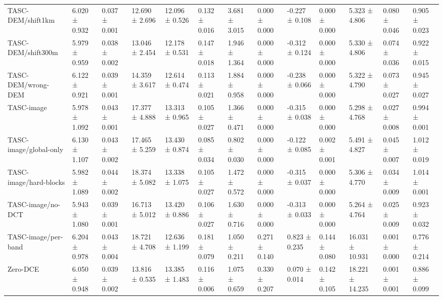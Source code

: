\begin{table}[t]
\begin{tabular}{lllllllllllll}
TASC-DEM/shift1km & 6.020 ± 0.932 & 0.037 ± 0.001 & 12.690 ± 2.696 & 12.096 ± 0.526 & 0.132 ± 0.016 & 3.681 ± 3.015 & 0.000 ± 0.000 & -0.227 ± 0.108 & 0.000 ± 0.000 & 5.323 ± 4.806 & 0.080 ± 0.046 & 0.905 ± 0.023 \\
TASC-DEM/shift300m & 5.979 ± 0.959 & 0.038 ± 0.002 & 13.046 ± 2.454 & 12.178 ± 0.531 & 0.147 ± 0.018 & 1.946 ± 1.364 & 0.000 ± 0.000 & -0.312 ± 0.124 & 0.000 ± 0.000 & 5.330 ± 4.806 & 0.074 ± 0.036 & 0.922 ± 0.015 \\
TASC-DEM/wrong-DEM & 6.122 ± 0.921 & 0.039 ± 0.001 & 14.359 ± 3.617 & 12.614 ± 0.474 & 0.113 ± 0.021 & 1.884 ± 0.958 & 0.000 ± 0.000 & -0.238 ± 0.066 & 0.000 ± 0.000 & 5.322 ± 4.790 & 0.073 ± 0.027 & 0.945 ± 0.027 \\
TASC-image & 5.978 ± 1.092 & 0.043 ± 0.001 & 17.377 ± 4.888 & 13.313 ± 0.965 & 0.105 ± 0.027 & 1.366 ± 0.471 & 0.000 ± 0.000 & -0.315 ± 0.038 & 0.000 ± 0.000 & 5.298 ± 4.768 & 0.027 ± 0.008 & 0.994 ± 0.001 \\
TASC-image/global-only & 6.130 ± 1.107 & 0.043 ± 0.002 & 17.465 ± 5.259 & 13.430 ± 0.874 & 0.085 ± 0.034 & 0.802 ± 0.030 & 0.000 ± 0.000 & -0.122 ± 0.085 & 0.002 ± 0.001 & 5.491 ± 4.827 & 0.045 ± 0.007 & 1.012 ± 0.019 \\
TASC-image/hard-blocks & 5.982 ± 1.089 & 0.044 ± 0.002 & 18.374 ± 5.082 & 13.338 ± 1.075 & 0.105 ± 0.027 & 1.472 ± 0.572 & 0.000 ± 0.000 & -0.315 ± 0.037 & 0.000 ± 0.000 & 5.306 ± 4.770 & 0.034 ± 0.009 & 1.014 ± 0.001 \\
TASC-image/no-DCT & 5.943 ± 1.080 & 0.039 ± 0.001 & 16.713 ± 5.012 & 13.420 ± 0.886 & 0.106 ± 0.027 & 1.630 ± 0.716 & 0.000 ± 0.000 & -0.313 ± 0.033 & 0.000 ± 0.000 & 5.264 ± 4.764 & 0.025 ± 0.009 & 0.923 ± 0.032 \\
TASC-image/per-band & 6.204 ± 0.978 & 0.043 ± 0.004 & 18.721 ± 4.708 & 12.636 ± 1.199 & 0.181 ± 0.079 & 1.050 ± 0.211 & 0.271 ± 0.140 & 0.823 ± 0.235 & 0.144 ± 0.080 & 16.031 ± 10.931 & 0.001 ± 0.000 & 0.776 ± 0.214 \\
Zero-DCE & 6.050 ± 0.948 & 0.039 ± 0.002 & 13.816 ± 0.535 & 13.385 ± 1.483 & 0.116 ± 0.006 & 1.075 ± 0.659 & 0.330 ± 0.207 & 0.070 ± 0.014 & 0.142 ± 0.105 & 18.221 ± 14.235 & 0.001 ± 0.001 & 0.886 ± 0.099 \\
\bottomrule
\end{tabular}
\end{table}
